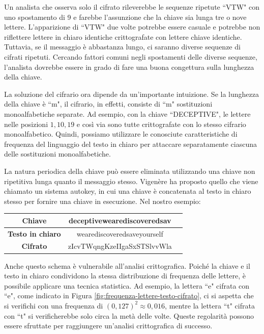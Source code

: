 Un analista che osserva solo il cifrato rileverebbe le sequenze ripetute ``VTW" con uno spostamento di
9 e farebbe l'assunzione che la chiave sia lunga tre o nove lettere. L'apparizione di ``VTW" due volte
potrebbe essere casuale e potrebbe non riflettere lettere in chiaro identiche crittografate con lettere
chiave identiche. Tuttavia, se il messaggio è abbastanza lungo, ci saranno diverse sequenze di cifrati
ripetuti. Cercando fattori comuni negli spostamenti delle diverse sequenze, l'analista dovrebbe essere
in grado di fare una buona congettura sulla lunghezza della chiave.

La soluzione del cifrario ora dipende da un'importante intuizione. Se la lunghezza della chiave è ``m", 
il cifrario, in effetti, consiste di ``m" sostituzioni monoalfabetiche separate. Ad esempio, con la chiave
``DECEPTIVE", le lettere nelle posizioni $1, 10, 19$ e così via sono tutte crittografate con lo stesso
cifrario monoalfabetico. Quindi, possiamo utilizzare le conosciute caratteristiche di frequenza del
linguaggio del testo in chiaro per attaccare separatamente ciascuna delle sostituzioni monoalfabetiche.

La natura periodica della chiave può essere eliminata utilizzando una chiave non ripetitiva lunga quanto
il messaggio stesso. Vigenère ha proposto quello che viene chiamato un sistema autokey, in cui una chiave
è concatenata al testo in chiaro stesso per fornire una chiave in esecuzione. Nel nostro esempio:

\begin{table}[H]
    \centering
    \begin{tabular}{|c|c|c|}
    \hline
    \textbf{Chiave} & deceptivewearediscoveredsav \\
    \hline
    \textbf{Testo in chiaro} & wearediscoveredsaveyourself \\
    \hline
    \textbf{Cifrato} & zIcvTWqngKzeIIgaSxSTSlvvWla \\
    \hline
    \end{tabular}
\end{table}

Anche questo schema è vulnerabile all'analisi crittografica. Poiché la chiave e il testo in
chiaro condividono la stessa distribuzione di frequenza delle lettere, è possibile applicare
una tecnica statistica. Ad esempio, la lettera ``e" cifrata con ``e", come indicato in
Figura \ref{fig:frequenza-lettere-testo-cifrato}, ci si aspetta che si verifichi con una
frequenza di $(0,127)^2 \approx 0,016$, mentre la lettera ``t" cifrata con ``t" si verificherebbe
solo circa la metà delle volte. Queste regolarità possono essere sfruttate per raggiungere un'analisi
crittografica di successo.

